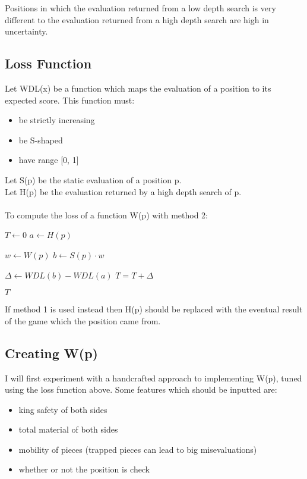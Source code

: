 \documentclass{paper}
\begin{document}
Positions in which the evaluation returned from a low depth search is very different to the evaluation returned from a high depth search are high in uncertainty.

\subsection{Loss Function}

Let WDL(x) be a function which maps the evaluation of a position to its expected score. This function must:

\begin{itemize}
	\item be strictly increasing
	\item be S-shaped
	\item have range [0, 1]
\end{itemize}

Let S(p) be the static evaluation of a position p. \\
Let H(p) be the evaluation returned by a high depth search of p. \\
\\
To compute the loss of a function W(p) with method 2:

\begin{algorithmic}
	\State $T \gets 0$
	\State $a \gets H(p)$

	\State $w \gets W(p)$
	\State $b \gets S(p) \cdot w$

	\State $\Delta \gets WDL(b) - WDL(a)$
	\State $T = T + \Delta$
	\EndFor

	\Return $T$
\end{algorithmic}

If method 1 is used instead then H(p) should be replaced with the eventual result of the game which the position came from.

\subsection{Creating W(p)}

I will first experiment with a handcrafted approach to implementing W(p), tuned using the loss function above. Some features which should be inputted are:
\begin{itemize}
	\item king safety of both sides
	\item total material of both sides
	\item mobility of pieces (trapped pieces can lead to big misevaluations)
	\item whether or not the position is check
\end{itemize}
\end{document}
